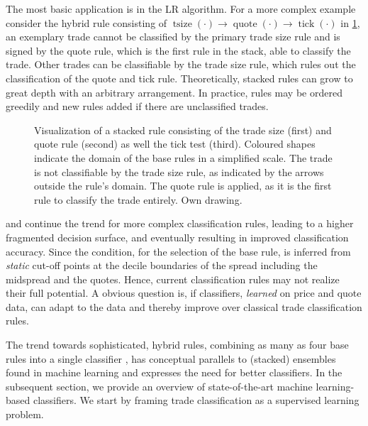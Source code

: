 The most basic application is in the \gls{LR} algorithm. For a more complex example consider the hybrid rule consisting of $\operatorname{tsize}(\cdot) \to \operatorname{quote}(\cdot) \to \operatorname{tick}(\cdot)$ in \cref{fig:stacking-algo}, an exemplary trade cannot be classified by the primary trade size rule and is signed by the quote rule, which is the first rule in the stack, able to classify the trade. Other trades can be classifiable by the trade size rule, which rules out the classification of the quote and tick rule. Theoretically, stacked rules can grow to great depth with an arbitrary arrangement. In practice, rules may be ordered greedily and new rules added if there are unclassified trades.

\begin{figure}[ht!]
\begin{center}
  
\end{center}
\caption[Visualization Of A Stacked Rule]{Visualization of a stacked rule consisting of the trade size (first) and quote rule (second) as well the tick test (third). Coloured shapes indicate the domain of the base rules in a simplified scale. The trade is not classifiable by the trade size rule, as indicated by the arrows outside the rule's domain. The quote rule is applied, as it is the first rule to classify the trade entirely. Own drawing.}
\label{fig:stacking-algo}
\end{figure}

\textcite[][3811]{chakrabartyTradeClassificationAlgorithms2007} and \textcite[][18]{grauerOptionTradeClassification2022} continue the trend for more complex classification rules, leading to a higher fragmented decision surface, and eventually resulting in improved classification accuracy. Since the condition, for the selection of the base rule, is inferred from \emph{static} cut-off points at the decile boundaries of the spread including the midspread and the quotes. Hence, current classification rules may not realize their full potential. A obvious question is, if classifiers, \emph{learned} on price and quote data, can adapt to the data and thereby improve over classical trade classification rules.

The trend towards sophisticated, hybrid rules, combining as many as four base rules into a single classifier \autocite[cp.][18]{grauerOptionTradeClassification2022}, has conceptual parallels to (stacked) ensembles found in machine learning and expresses the need for better classifiers. In the subsequent section, we provide an overview of state-of-the-art machine learning-based classifiers. We start by framing trade classification as a supervised learning problem.

